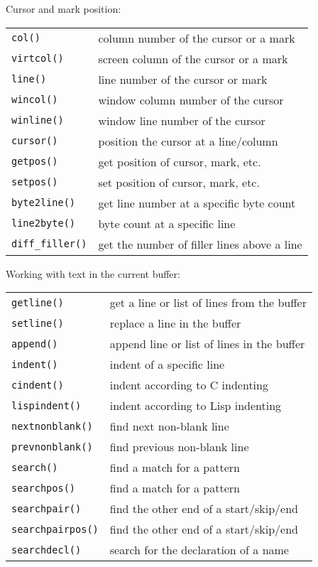 Cursor and mark position:
\label{cursor-functions}
\label{mark-functions}
\begin{center} \begin{tabular}{l l}
				\verb!col()! & column number of the cursor or a mark \\
				\verb!virtcol()! & screen column of the cursor or a mark \\
				\verb!line()! & line number of the cursor or mark \\
				\verb!wincol()! & window column number of the cursor \\
				\verb!winline()! & window line number of the cursor \\
				\verb!cursor()! & position the cursor at a line/column \\
				\verb!getpos()! & get position of cursor, mark, etc. \\
				\verb!setpos()! & set position of cursor, mark, etc. \\
				\verb!byte2line()! & get line number at a specific byte count \\
				\verb!line2byte()! & byte count at a specific line \\
				\verb!diff_filler()! & get the number of filler lines above a line \\
\end{tabular} \end{center}

Working with text in the current buffer:
\label{text-functions}
\begin{center} \begin{tabular}{l l}
				\verb!getline()! & get a line or list of lines from the buffer \\
				\verb!setline()! & replace a line in the buffer \\
				\verb!append()! & append line or list of lines in the buffer \\
				\verb!indent()! & indent of a specific line \\
				\verb!cindent()! & indent according to C indenting \\
				\verb!lispindent()! & indent according to Lisp indenting \\
				\verb!nextnonblank()! & find next non-blank line \\
				\verb!prevnonblank()! & find previous non-blank line \\
				\verb!search()! & find a match for a pattern \\
				\verb!searchpos()! & find a match for a pattern \\
				\verb!searchpair()! & find the other end of a start/skip/end \\
				\verb!searchpairpos()! & find the other end of a start/skip/end \\
				\verb!searchdecl()! & search for the declaration of a name \\
\end{tabular} \end{center}

